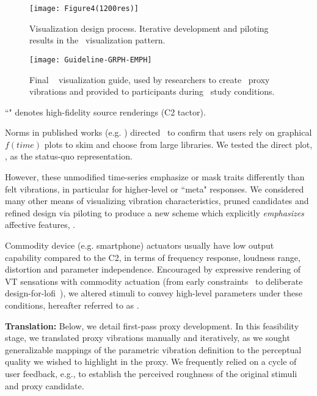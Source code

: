     \begin{figure*}
        \centering
        \texttt{[image: Figure4(1200res)]}
        \caption{Visualization design process. Iterative development and piloting results in the \linear~visualization pattern.}
        \label{fig:vis:initialdesigns}
    \end{figure*}
    
        \begin{figure*}
        \centering
                \texttt{[image: Guideline-GRPH-EMPH]}
                \caption{Final \linear~ visualization guide, used by researchers to create \linear~proxy vibrations and provided to participants during \linear~study conditions.}
            \label{fig:vis:ref:guideline}
    \end{figure*}

``\hifi" denotes high-fidelity source renderings (C2 tactor).

Norms in published works (e.g. \cite{Chan2008}) directed~\cite{Seifi2015} to confirm that users %
rely on graphical $f(time)$ plots to skim and choose from large libraries.  We tested the direct plot, \original, as the status-quo representation.

However, these unmodified time-series emphasize or mask traits differently than felt vibrations, in particular for higher-level or ``meta" responses. %
We considered many other means of visualizing vibration characteristics, pruned candidates and refined design via piloting to produce a new scheme which explicitly \textit{emphasizes} affective features, \linear.


Commodity device (e.g. smartphone) actuators usually have low output capability compared to the C2, in terms of frequency response, loudness range, distortion and parameter independence. Encouraged %
by expressive rendering of VT sensations with commodity actuation (from early constraints~\cite{Chan2008} to deliberate design-for-lofi~\cite{Israr2015}), we altered stimuli to convey high-level parameters under these conditions,
hereafter referred to as \lofi.

\textbf{Translation:} 
Below, we detail first-pass proxy development.
In this feasibility stage,  we translated proxy vibrations manually and iteratively, as we sought generalizable mappings of the parametric vibration definition to the perceptual quality we wished to highlight in the proxy. We frequently relied on a cycle of user feedback, e.g., to establish the perceived  roughness of the original stimuli and proxy candidate. 


